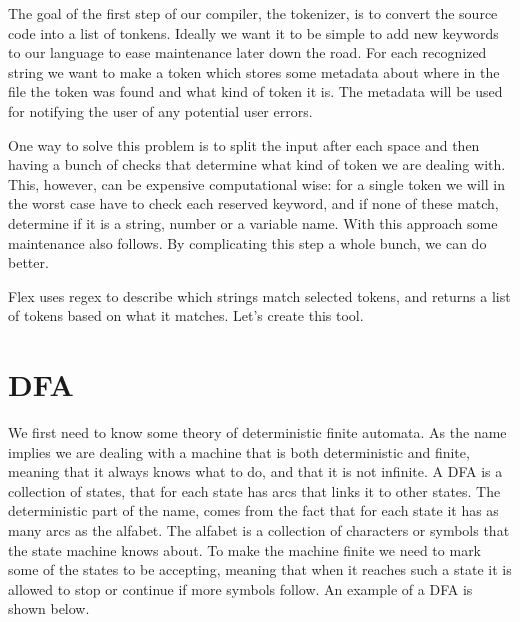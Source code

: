 The goal of the first step of our compiler, the tokenizer, is to convert the source code into a list of tonkens. Ideally we want it to be simple to add new keywords to our language to ease maintenance later down the road. For each recognized string we want to make a token which stores some metadata about where in the file the token was found and what kind of token it is. The metadata will be used for notifying the user of any potential user errors.

One way to solve this problem is to split the input after each space and then having a bunch of checks that determine what kind of token we are dealing with. This, however, can be expensive computational wise: for a single token we will in the worst case have to check each reserved keyword, and if none of these match, determine if it is a string, number or a variable name. With this approach some maintenance also follows. By complicating this step a whole bunch, we can do better. 

Flex uses regex to describe which strings match selected tokens, and returns a list of tokens based on what it matches. Let's create this tool.

\section*{DFA}
We first need to know some theory of deterministic finite automata. As the name implies we are dealing with a machine that is both deterministic and finite, meaning that it always knows what to do, and that it is not infinite. A DFA is a collection of states, that for each state has arcs that links it to other states. The deterministic part of the name, comes from the fact that for each state it has as many arcs as the alfabet. The alfabet is a collection of characters or symbols that the state machine knows about. To make the machine finite we need to mark some of the states to be accepting, meaning that when it reaches such a state it is allowed to stop or continue if more symbols follow. An example of a DFA is shown below.

\begin{center}
\end{center}

